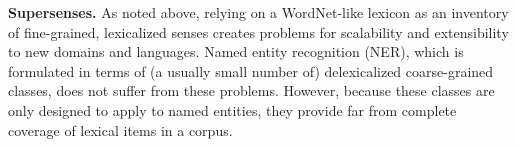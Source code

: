 \documentclass[11pt]{article}
\newcommand{\ensuretext}[1]{#1}
\newcommand{\nssmarker}{\ensuretext{\textcolor{magenta}{\ensuremath{^{\textsc{NS}}_{\textsc{S}}}}}}
\newcommand{\arkcomment}[3]{\ensuretext{\textcolor{#3}{[#1 #2]}}}
\newcommand{\nss}[1]{\arkcomment{\nssmarker}{#1}{magenta}}
\newcommand{\longversion}[1]{#1} %
\begin{document}
\textbf{Supersenses.}
% 
As noted above, relying on a WordNet-like lexicon as an inventory of fine-grained, lexicalized senses 
creates problems for scalability and extensibility to new domains and languages. 
Named entity recognition (NER), which is formulated in terms of (a usually small number of) delexicalized coarse-grained classes, 
does not suffer from these problems. However, because these classes are only designed to apply to named entities, 
they provide far from complete coverage of lexical items in a corpus.
\end{document}
